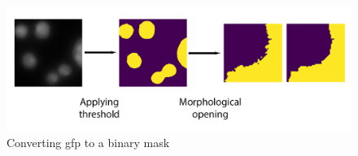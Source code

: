 \begin{figure}[H]
	\begin{center}
		\includegraphics[width=0.5\linewidth]{bilder/gfp/binary-bce/preprocessing/preprocessing-gfp.png}
		\caption{Converting gfp to a binary mask}\label{fig:gfp-binary}
	\end{center}
\end{figure}
